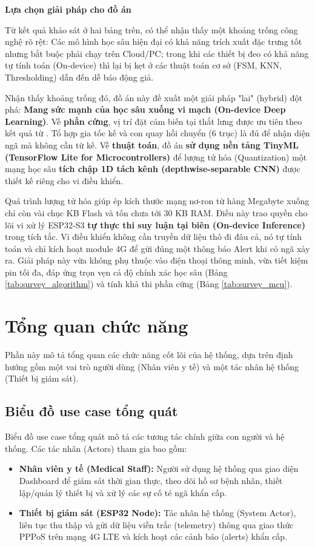 \documentclass[../DoAn.tex]{subfiles}
\begin{document}
\textbf{Lựa chọn giải pháp cho đồ án}

Từ kết quả khảo sát ở hai bảng trên, có thể nhận thấy một khoảng trống công nghệ rõ rệt: Các mô hình học sâu hiện đại có khả năng trích xuất đặc trưng tốt nhưng bắt buộc phải chạy trên Cloud/PC; trong khi các thiết bị đeo có khả năng tự tính toán (On-device) thì lại bị kẹt ở các thuật toán cơ sở (FSM, KNN, Thresholding) dẫn đến dễ báo động giả.

Nhận thấy khoảng trống đó, đồ án này đề xuất một giải pháp "lai" (hybrid) đột phá: \textbf{Mang sức mạnh của học sâu xuống vi mạch (On-device Deep Learning)}. Về \textbf{phần cứng}, vị trí đặt cảm biến tại thắt lưng được ưu tiên theo kết quả từ \cite{booranawong2025stairs, cai2026stanet, park2025fallrisk}. Tổ hợp gia tốc kế và con quay hồi chuyển (6 trục) là đủ để nhận diện ngã mà không cần từ kế. Về \textbf{thuật toán}, đồ án \textbf{sử dụng nền tảng TinyML (TensorFlow Lite for Microcontrollers)} để lượng tử hóa (Quantization) một mạng học sâu \textbf{tích chập 1D tách kênh (depthwise-separable CNN)} được thiết kế riêng cho vi điều khiển.

Quá trình lượng tử hóa giúp ép kích thước mạng nơ-ron từ hàng Megabyte xuống chỉ còn vài chục KB Flash và tốn chưa tới 30 KB RAM. Điều này trao quyền cho lõi vi xử lý ESP32-S3 \textbf{tự thực thi suy luận tại biên (On-device Inference)} trong tích tắc. Vi điều khiển không cần truyền dữ liệu thô đi đâu cả, nó tự tính toán và chỉ kích hoạt module 4G để gửi đúng một thông báo Alert khi có ngã xảy ra. Giải pháp này vừa không phụ thuộc vào điện thoại thông minh, vừa tiết kiệm pin tối đa, đáp ứng trọn vẹn cả độ chính xác học sâu (Bảng \ref{tab:survey_algorithm}) và tính khả thi phần cứng (Bảng \ref{tab:survey_mcu}).

\section{Tổng quan chức năng}
\label{section:2.2}
Phần này mô tả tổng quan các chức năng cốt lõi của hệ thống, dựa trên định hướng gồm một vai trò người dùng (Nhân viên y tế) và một tác nhân hệ thống (Thiết bị giám sát).

\subsection{Biểu đồ use case tổng quát}
\label{subsection:2.2.1}
Biểu đồ use case tổng quát mô tả các tương tác chính giữa con người và hệ thống. Các tác nhân (Actors) tham gia bao gồm:
\begin{itemize}
    \item \textbf{Nhân viên y tế (Medical Staff):} Người sử dụng hệ thống qua giao diện Dashboard để giám sát thời gian thực, theo dõi hồ sơ bệnh nhân, thiết lập/quản lý thiết bị và xử lý các sự cố té ngã khẩn cấp.
    \item \textbf{Thiết bị giám sát (ESP32 Node):} Tác nhân hệ thống (System Actor), liên tục thu thập và gửi dữ liệu viễn trắc (telemetry) thông qua giao thức PPPoS trên mạng 4G LTE và kích hoạt các cảnh báo (alerts) khẩn cấp.
\end{itemize}
\end{document}
